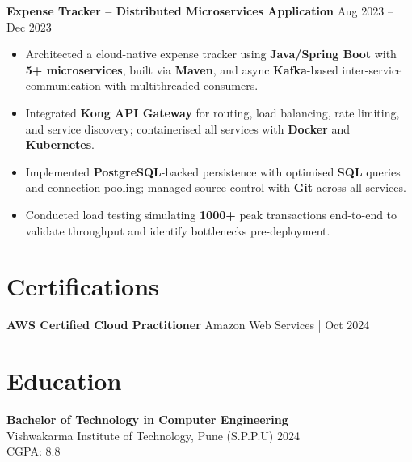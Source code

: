 \documentclass[a4paper,10pt]{article}
\begin{document}
\textbf{Expense Tracker -- Distributed Microservices Application} \hfill Aug 2023 -- Dec 2023
\begin{itemize}[leftmargin=*]
    \item Architected a cloud-native expense tracker using \textbf{Java/Spring Boot} with \textbf{5+ microservices}, built via \textbf{Maven}, and async \textbf{Kafka}-based inter-service communication with multithreaded consumers.
    \item Integrated \textbf{Kong API Gateway} for routing, load balancing, rate limiting, and service discovery; containerised all services with \textbf{Docker} and \textbf{Kubernetes}.
    \item Implemented \textbf{PostgreSQL}-backed persistence with optimised \textbf{SQL} queries and connection pooling; managed source control with \textbf{Git} across all services.
    \item Conducted load testing simulating \textbf{1000+} peak transactions end-to-end to validate throughput and identify bottlenecks pre-deployment.
\end{itemize}

\section*{Certifications}
\textbf{AWS Certified Cloud Practitioner} \hfill Amazon Web Services \;|\; Oct 2024

\section*{Education}

\textbf{Bachelor of Technology in Computer Engineering} \\
Vishwakarma Institute of Technology, Pune (S.P.P.U) \hfill 2024 \\
CGPA: 8.8
\end{document}
